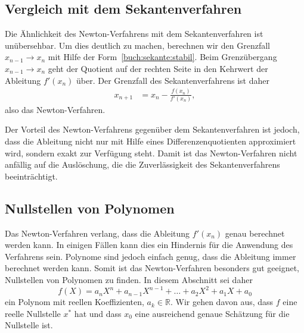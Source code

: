 %
%
\subsection{Vergleich mit dem Sekantenverfahren
\label{buch:subsection:newtonsekanten}}
%
Die Ähnlichkeit des Newton-Verfahrens mit dem Sekantenverfahren ist 
unübersehbar.
Um dies deutlich zu machen, berechnen wir den Grenzfall $x_{n-1}\to x_n$
mit Hilfe der Form~\eqref{buch:sekante:stabil}.
Beim Grenzübergang $x_{n-1}\to x_n$ geht der Quotient auf der rechten
Seite in den Kehrwert der Ableitung $f'(x_n)$ über.
%
Der Grenzfall des Sekantenverfahrens ist daher
\begin{align*}
x_{n+1}
&=
x_n -\frac{f(x_n)}{f'(x_n)},
\end{align*}
also das Newton-Verfahren.
%

Der Vorteil des Newton-Verfahrens gegenüber dem Sekantenverfahren ist
jedoch, dass die Ableitung nicht nur mit Hilfe eines Differenzenquotienten
approximiert wird, sondern exakt zur Verfügung steht.
Damit ist das Newton-Verfahren nicht anfällig auf die Auslöschung, die
die Zuverlässigkeit des Sekantenverfahrens beeinträchtigt.

%
%
\subsection{Nullstellen von Polynomen
\label{buch:subsection:polynomnullstellen}}
%
%
Das Newton-Verfahren verlang, dass die Ableitung $f'(x_n)$ genau
berechnet werden kann.
In einigen Fällen kann dies ein Hindernis für die Anwendung des
Verfahrens sein.
Polynome sind jedoch einfach genug, dass die Ableitung immer berechnet
werden kann.
%
Somit ist das Newton-Verfahren besonders gut geeignet, Nullstellen von
Polynomen zu finden.
In diesem Abschnitt sei daher
\begin{equation}
f(X) = a_nX^n + a_{n-1}X^{n-1} + \dots + a_2X^2 + a_1X + a_0
\label{buch:equation:nullstellenpolynom}
\end{equation}
ein Polynom mit reellen Koeffizienten, $a_k\in\mathbb R$.
Wir gehen davon aus, dass $f$ eine reelle Nullstelle $x^*$ hat
und dass $x_0$ eine ausreichend genaue Schätzung für die Nullstelle ist.

